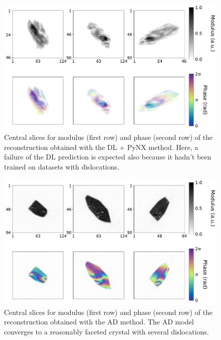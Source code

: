 \begin{figure}[H]
  \centering
  \includegraphics[width=\textwidth]{figures/AD/dl_pynx_mouad.pdf}
  \caption{Central slices for modulus (first row) and phase (second row) of the reconstruction obtained with the DL + PyNX 
  method. Here, a failure of the DL prediction is expected also because it hadn't been trained on datasets with dislocations. }
  \label{fig:dl_pynx_mouad}
\end{figure}


\begin{figure}[H]
  \centering
  \includegraphics[width=\textwidth]{figures/AD/ad_mouad.pdf}
  \caption{Central slices for modulus (first row) and phase (second row) of the reconstruction obtained with the AD method.
  The AD model converges to a reasonably faceted crystal with several dislocations.}
  \label{fig:ad_mouad}
\end{figure}

